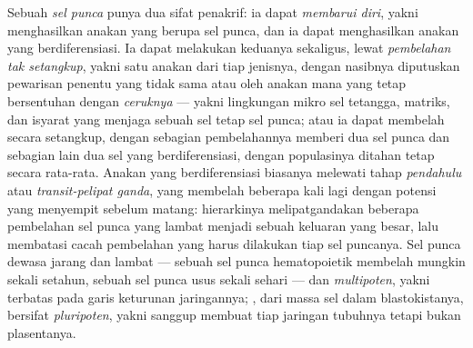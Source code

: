 \begin{definition}\label{def:b3:stem-cells:stem}
%
Sebuah \emph{sel punca} punya dua sifat penakrif: ia dapat \emph{membarui diri},
yakni menghasilkan anakan yang berupa sel punca, dan ia dapat menghasilkan anakan
yang berdiferensiasi. Ia dapat melakukan keduanya sekaligus, lewat \emph{pembelahan
tak setangkup}, yakni satu anakan dari tiap jenisnya, dengan nasibnya diputuskan pewarisan
penentu yang tidak sama atau oleh anakan mana yang tetap bersentuhan dengan
\emph{ceruknya} --- yakni lingkungan mikro sel tetangga,
matriks, dan isyarat yang menjaga sebuah sel tetap sel punca; atau ia dapat membelah
secara setangkup, dengan sebagian pembelahannya memberi dua sel punca dan sebagian lain dua sel
yang berdiferensiasi, dengan populasinya ditahan tetap secara rata-rata.
Anakan yang berdiferensiasi biasanya melewati tahap \emph{pendahulu}
atau \emph{transit-pelipat ganda}, yang membelah beberapa kali lagi dengan
potensi yang menyempit sebelum matang: hierarkinya melipatgandakan beberapa
pembelahan sel punca yang lambat menjadi sebuah keluaran yang besar, lalu membatasi cacah
pembelahan yang harus dilakukan tiap sel puncanya. Sel punca dewasa jarang dan lambat
--- sebuah sel punca hematopoietik membelah mungkin sekali setahun, sebuah sel punca
usus sekali sehari --- dan \emph{multipoten}, yakni terbatas pada
garis keturunan jaringannya; , dari massa sel dalam
blastokistanya, bersifat \emph{pluripoten}, yakni sanggup membuat tiap
jaringan tubuhnya tetapi bukan plasentanya.
\end{definition}

